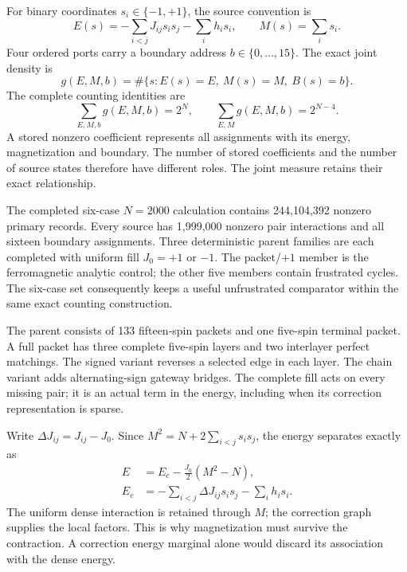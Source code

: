 For binary coordinates $s_i\in\{-1,+1\}$, the source convention is
\begin{equation}
 E(s)=-\sum_{i<j}J_{ij}s_i s_j-\sum_i h_i s_i,
 \qquad M(s)=\sum_i s_i.
\end{equation}
Four ordered ports carry a boundary address $b\in\{0,\ldots,15\}$. The exact joint density is
\begin{equation}
 g(E,M,b)=\#\{s:E(s)=E,\ M(s)=M,\ B(s)=b\}.
\end{equation}
The complete counting identities are
\begin{equation}
 \sum_{E,M,b}g(E,M,b)=2^N,
 \qquad \sum_{E,M}g(E,M,b)=2^{N-4}.
\end{equation}
A stored nonzero coefficient represents all assignments with its energy, magnetization and boundary. The number of stored coefficients and the number of source states therefore have different roles. The joint measure retains their exact relationship.

The completed six-case $N=2000$ calculation contains 244,104,392 nonzero primary records. Every source has 1,999,000 nonzero pair interactions and all sixteen boundary assignments. Three deterministic parent families are each completed with uniform fill $J_0=+1$ or $-1$. The packet/$+1$ member is the ferromagnetic analytic control; the other five members contain frustrated cycles. The six-case set consequently keeps a useful unfrustrated comparator within the same exact counting construction.

The parent consists of 133 fifteen-spin packets and one five-spin terminal packet. A full packet has three complete five-spin layers and two interlayer perfect matchings. The signed variant reverses a selected edge in each layer. The chain variant adds alternating-sign gateway bridges. The complete fill acts on every missing pair; it is an actual term in the energy, including when its correction representation is sparse.

Write $\Delta J_{ij}=J_{ij}-J_0$. Since $M^2=N+2\sum_{i<j}s_i s_j$, the energy separates exactly as
\begin{align}
 E&=E_c-\frac{J_0}{2}(M^2-N),\\
 E_c&=-\sum_{i<j}\Delta J_{ij}s_i s_j-\sum_i h_i s_i.
\end{align}
The uniform dense interaction is retained through $M$; the correction graph supplies the local factors. This is why magnetization must survive the contraction. A correction energy marginal alone would discard its association with the dense energy.

